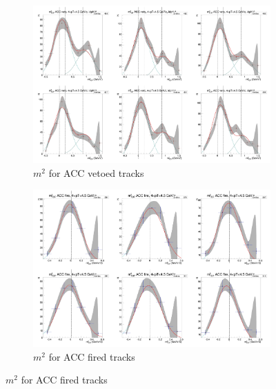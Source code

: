 \begin{figure}[H]
  \ContinuedFloat
    \begin{subfigure}{1\textwidth}
    \includegraphics[width=1\textwidth]{hiptfits/neg/PSm2_cent0_ich0_accfire0_ptbin14.jpg}
    \caption{$m^2$ for ACC vetoed tracks}
    \end{subfigure}
    \begin{subfigure}{1\textwidth}
    \includegraphics[width=1\textwidth]{hiptfits/neg/PSm2_cent0_ich0_accfire1_ptbin14.jpg}
    \caption{$m^2$ for ACC fired tracks}
    \end{subfigure}  
\end{figure}
